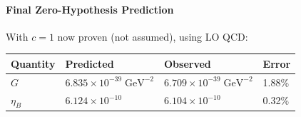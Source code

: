 \documentclass[
  11pt,
]{article}
\begin{document}
\bigskip

\hypertarget{final-zero-hypothesis-prediction}{%
\paragraph{Final Zero-Hypothesis
Prediction}\label{final-zero-hypothesis-prediction}}

With \(c = 1\) now proven (not assumed), using LO QCD:

\begin{longtable}[]{@{}llll@{}}
\toprule
\begin{minipage}[b]{0.22\columnwidth}\raggedright
Quantity\strut
\end{minipage} & \begin{minipage}[b]{0.22\columnwidth}\raggedright
Predicted\strut
\end{minipage} & \begin{minipage}[b]{0.22\columnwidth}\raggedright
Observed\strut
\end{minipage} & \begin{minipage}[b]{0.22\columnwidth}\raggedright
Error\strut
\end{minipage}\tabularnewline
\midrule
\endhead
\begin{minipage}[t]{0.22\columnwidth}\raggedright
\(G\)\strut
\end{minipage} & \begin{minipage}[t]{0.22\columnwidth}\raggedright
\(6.835 \times 10^{-39}\;\text{GeV}^{-2}\)\strut
\end{minipage} & \begin{minipage}[t]{0.22\columnwidth}\raggedright
\(6.709 \times 10^{-39}\;\text{GeV}^{-2}\)\strut
\end{minipage} & \begin{minipage}[t]{0.22\columnwidth}\raggedright
1.88\%\strut
\end{minipage}\tabularnewline
\begin{minipage}[t]{0.22\columnwidth}\raggedright
\(\eta_B\)\strut
\end{minipage} & \begin{minipage}[t]{0.22\columnwidth}\raggedright
\(6.124 \times 10^{-10}\)\strut
\end{minipage} & \begin{minipage}[t]{0.22\columnwidth}\raggedright
\(6.104 \times 10^{-10}\)\strut
\end{minipage} & \begin{minipage}[t]{0.22\columnwidth}\raggedright
0.32\%\strut
\end{minipage}\tabularnewline
\bottomrule
\end{longtable}
\end{document}
